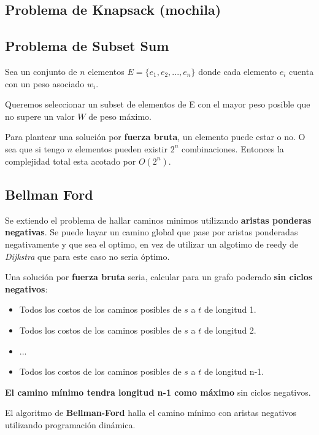 \documentclass{article}
\begin{document}
\newpage
\subsection{Problema de Knapsack (mochila) }

\newpage
\subsection{Problema de Subset Sum }

Sea un conjunto de \(n\) elementos \(E=\{e_1, e_2, ..., e_n \}\) donde cada elemento \(e_i\) 
cuenta con un peso asociado \(w_i\).

Queremos seleccionar un subset de elementos de E con el mayor peso posible que no supere un 
valor \(W\) de peso máximo.

Para plantear una solución por \textbf{fuerza bruta}, un elemento puede estar o no. O sea que si
tengo \(n\) elementos pueden existir \(2^n\) combinaciones. Entonces la complejidad total esta acotado
por \(O(2^n)\).



\newpage
\subsection{Bellman Ford}

Se extiendo el problema de hallar caminos minimos utilizando \textbf{aristas ponderas negativas}. 
Se puede hayar un camino global que pase por aristas ponderadas negativamente y que sea el optimo, 
en vez de utilizar un algotimo de reedy de \textit{Dijkstra} que para este caso no seria óptimo.

Una solución por \textbf{fuerza bruta} seria, calcular para un grafo poderado \textbf{sin ciclos negativos}:

\begin{itemize}
    \item Todos los costos de los caminos posibles de \(s\) a \(t\) de longitud 1.
    \item Todos los costos de los caminos posibles de \(s\) a \(t\) de longitud 2.
    \item ...
    \item Todos los costos de los caminos posibles de \(s\) a \(t\) de longitud n-1.
\end{itemize}

\textbf{El camino mínimo tendra longitud n-1 como máximo} sin ciclos negativos.

El algoritmo de \textbf{Bellman-Ford} halla el camino mínimo con aristas negativos utilizando programación dinámica.
\end{document}
